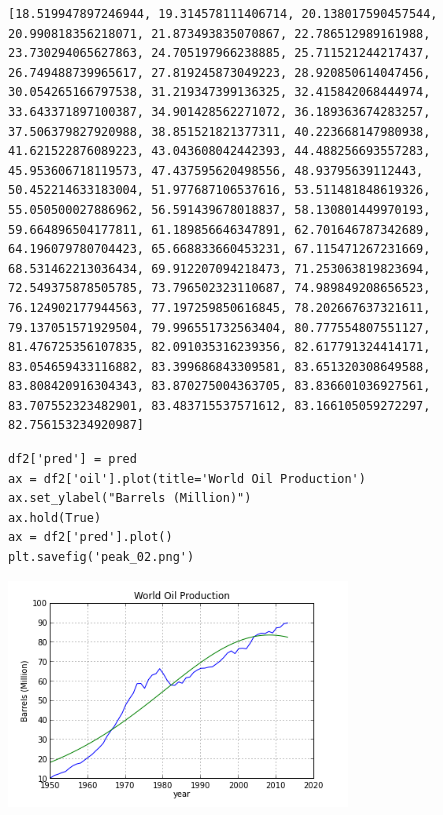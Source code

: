 \documentclass[12pt,fleqn]{article}\usepackage{../common}
\begin{document}
\begin{verbatim}
[18.519947897246944, 19.314578111406714, 20.138017590457544, 20.990818356218071, 21.873493835070867, 22.786512989161988, 23.730294065627863, 24.705197966238885, 25.711521244217437, 26.749488739965617, 27.819245873049223, 28.920850614047456, 30.054265166797538, 31.219347399136325, 32.415842068444974, 33.643371897100387, 34.901428562271072, 36.189363674283257, 37.506379827920988, 38.851521821377311, 40.223668147980938, 41.621522876089223, 43.043608042442393, 44.488256693557283, 45.953606718119573, 47.437595620498556, 48.93795639112443, 50.452214633183004, 51.977687106537616, 53.511481848619326, 55.050500027886962, 56.591439678018837, 58.130801449970193, 59.664896504177811, 61.189856646347891, 62.701646787342689, 64.196079780704423, 65.668833660453231, 67.115471267231669, 68.531462213036434, 69.912207094218473, 71.253063819823694, 72.549375878505785, 73.796502323110687, 74.989849208656523, 76.124902177944563, 77.197259850616845, 78.202667637321611, 79.137051571929504, 79.996551732563404, 80.777554807551127, 81.476725356107835, 82.091035316239356, 82.617791324414171, 83.054659433116882, 83.399686843309581, 83.651320308649588, 83.808420916304343, 83.870275004363705, 83.836601036927561, 83.707552323482901, 83.483715537571612, 83.166105059272297, 82.756153234920987]
\end{verbatim}

\begin{verbatim}
df2['pred'] = pred
ax = df2['oil'].plot(title='World Oil Production')
ax.set_ylabel("Barrels (Million)")
ax.hold(True)
ax = df2['pred'].plot()
plt.savefig('peak_02.png')
\end{verbatim}

\includegraphics[height=6cm]{peak_02.png}
\end{document}
